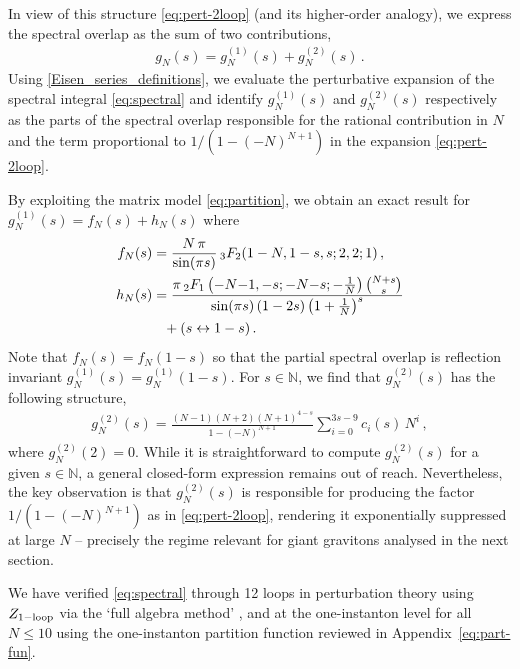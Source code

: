 \documentclass[aps,prl,twocolumn, longbibliography,footinbib,superscriptaddress, preprintnumbers]{revtex4-1}
\newcommand{\<}{\langle}
\renewcommand{\>}{\rangle}
\begin{document}
In view of this structure \eqref{eq:pert-2loop} (and its higher-order analogy), we express the spectral overlap as the sum of two contributions,
  \begin{align} \label{eq:gN(s)}
 g_N(s)  = g^{(1)}_N(s)  + g^{(2)}_N(s)   \, .
  \end{align}
Using \eqref{Eisen_series_definitions}, we evaluate the perturbative expansion of the spectral integral \eqref{eq:spectral} and identify
 $g^{(1)}_N(s)$ and $g^{(2)}_N(s)$ respectively as the parts of the spectral overlap responsible for the rational contribution in $N$ and the term proportional to  $1/(1 {-} (-N)^{N+1})$ in the expansion \eqref{eq:pert-2loop}.

By exploiting the matrix model \eqref{eq:partition}, we obtain an exact result for $ g^{(1)}_N(s)=f_N(s) + h_N(s)$ where
    \begin{align} \label{eq:fN}
 f_N(s) &={N\, \pi \over \sin(\pi s)}  \, _3F_2(1-N,1-s,s;2,2;1)   \, ,
\\
h_N(s) &\notag =  \frac{  \pi\, _2F_1\left(-N{-}1,-s;-N{-}s;-\frac{1}{N}\right) { N+s \choose s}}{\sin(\pi s) \, (1-2s)  \left(1+ {1\over N} \right)^s} \\
&\phantom{=}+(s\leftrightarrow 1-s)\, . \label{eq:hN}
  \end{align}
Note that $f_N(s) = f_N(1-s)$ so that the partial spectral overlap is reflection invariant $g^{(1)}_N(s) = g^{(1)}_N(1-s)$.
For $s\in \mathbb{N}$, we find that $g^{(2)}_N(s)$  has the following structure,
      \begin{align}
  g^{(2)}_N(s) =  \frac{(N{-}1)  (N{+}2) (N{+}1)^{4-s}}{1 {-} (-N)^{N+1}} \sum_{i=0}^{3s-9} c_i (s) \, N^i \, ,
  \end{align}
where $g^{(2)}_N(2)=0$. While it is straightforward to compute $g^{(2)}_N(s)$ for a given $s\in \mathbb{N}$, a general closed-form expression remains out of reach. Nevertheless, the key observation is that $g^{(2)}_N(s)$ is responsible for producing the factor $1/(1 {-} (-N)^{N+1})$ as in \eqref{eq:pert-2loop}, rendering it exponentially suppressed at large $N$ -- precisely the regime relevant for giant gravitons analysed in the next section.


 We have verified \eqref{eq:spectral} through 12 loops in perturbation theory  using $Z_{\rm 1-loop}$ via the `full algebra method' \cite{Billo:2017glv}, and at the one-instanton level for all $N \leq 10$ using the one-instanton partition function reviewed in Appendix~\ref{eq:part-fun}.
\end{document}

